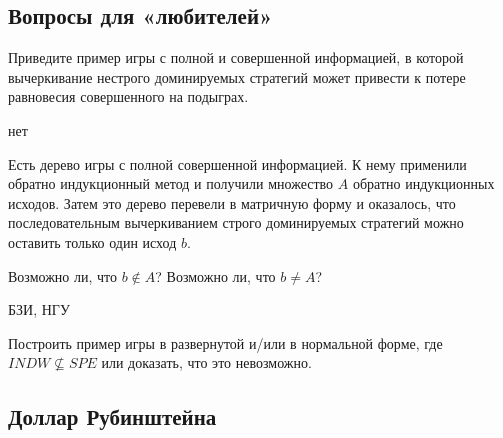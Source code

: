 \subsection{Вопросы для «любителей»}


\begin{problem}
Приведите пример  игры с полной и совершенной информацией, в которой вычеркивание нестрого доминируемых стратегий может привести к потере равновесия совершенного на подыграх.
\begin{sol}
нет
\end{sol}
\end{problem}


\begin{problem}
Есть дерево игры с полной совершенной информацией. К нему применили обратно индукционный метод и получили множество  $A$  обратно индукционных исходов. Затем это дерево перевели в матричную форму и оказалось, что последовательным вычеркиванием строго доминируемых стратегий можно оставить только один исход  $b$.\par
Возможно ли, что  $b\notin A$? Возможно ли, что  $b\ne A$?\par



\begin{sol}

\end{sol}
\end{problem}
\begin{problem}
\begin{source}
БЗИ, НГУ
\end{source}
{\rm
Построить пример игры в развернутой и/или в нормальной
форме, где $INDW \not\subseteq SPE$ или доказать, что это
невозможно. }



\begin{sol}

\end{sol}
\end{problem}



\subsection{Доллар Рубинштейна}

